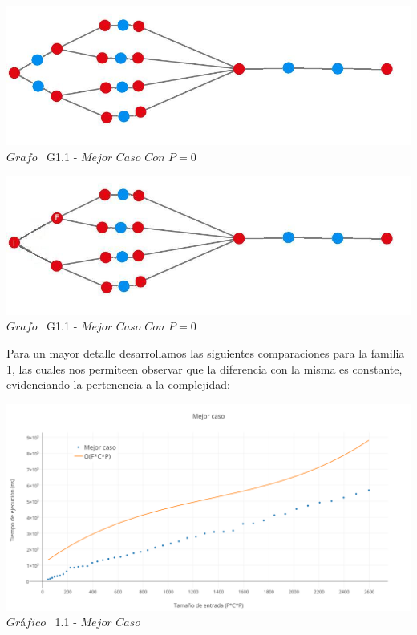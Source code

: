 \vspace*{0.3cm} \vspace*{0.3cm}
  \begin{center}
\includegraphics[scale=0.65]{./EJ1/ej1grafomejorcaso.jpeg}
{$Grafo$ \ G1.1 - $Mejor$ $Caso$ $Con$ $P=0$ }
  \end{center}
  \vspace*{0.3cm}

\vspace*{0.3cm} \vspace*{0.3cm}
  \begin{center}
\includegraphics[scale=0.65]{./EJ1/ej1grafomejorcaso2.jpeg}
{$Grafo$ \ G1.1 - $Mejor$ $Caso$ $Con$ $P=0$ }
  \end{center}
  \vspace*{0.3cm}

Para un mayor detalle desarrollamos las siguientes comparaciones para la familia 1, las cuales nos permiteen observar que la diferencia con la misma es constante, evidenciando la pertenencia a la complejidad:\\

\vspace*{0.3cm} \vspace*{0.3cm}
  \begin{center}
 \includegraphics[scale=0.65]{./EJ1/mejorcaso.png}
 {$Gr$\'a$fico$ \ 1.1 - $Mejor$ $Caso$}
  \end{center}
  \vspace*{0.3cm}

